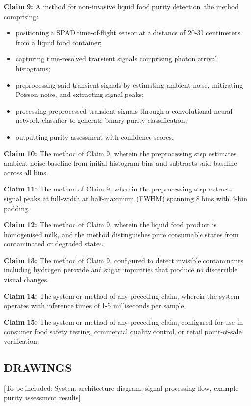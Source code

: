 \documentclass[11pt,a4paper]{article}
\begin{document}
\begin{enumerate}[leftmargin=*,label=\alph*)]
\textbf{Claim 9:} A method for non-invasive liquid food purity detection, the method comprising:
\begin{itemize}[leftmargin=*]
\item positioning a SPAD time-of-flight sensor at a distance of 20-30 centimeters from a liquid food container;
\item capturing time-resolved transient signals comprising photon arrival histograms;
\item preprocessing said transient signals by estimating ambient noise, mitigating Poisson noise, and extracting signal peaks;
\item processing preprocessed transient signals through a convolutional neural network classifier to generate binary purity classification;
\item outputting purity assessment with confidence scores.
\end{itemize}

\textbf{Claim 10:} The method of Claim 9, wherein the preprocessing step estimates ambient noise baseline from initial histogram bins and subtracts said baseline across all bins.

\textbf{Claim 11:} The method of Claim 9, wherein the preprocessing step extracts signal peaks at full-width at half-maximum (FWHM) spanning 8 bins with 4-bin padding.

\textbf{Claim 12:} The method of Claim 9, wherein the liquid food product is homogenised milk, and the method distinguishes pure consumable states from contaminated or degraded states.

\textbf{Claim 13:} The method of Claim 9, configured to detect invisible contaminants including hydrogen peroxide and sugar impurities that produce no discernible visual changes.

\textbf{Claim 14:} The system or method of any preceding claim, wherein the system operates with inference times of 1-5 milliseconds per sample.

\textbf{Claim 15:} The system or method of any preceding claim, configured for use in consumer food safety testing, commercial quality control, or retail point-of-sale verification.

\vspace{0.5em}
\subsection{DRAWINGS}

[To be included: System architecture diagram, signal processing flow, example purity assessment results]


\end{enumerate}
\end{document}
